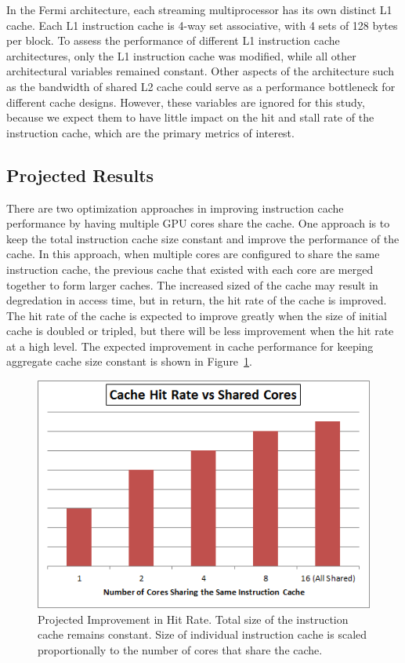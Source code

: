 In the Fermi architecture, each streaming multiprocessor has
its own distinct L1 cache. 
Each L1 instruction cache is 4-way set associative, with 4 sets of
128 bytes per block. 
To assess the  performance of different L1 instruction cache
architectures, only the L1 instruction cache was modified, while all
other architectural variables remained constant. 
Other aspects of the architecture such as the bandwidth of shared L2
cache could serve as a performance bottleneck for different cache
designs. 
However, these variables are ignored for this study, because we expect
them to have little impact on the hit and stall rate of the
instruction cache, which are the primary metrics of interest.

\subsection{Projected Results}

There are two optimization approaches in improving instruction cache performance by having
multiple GPU cores share the cache. 
One approach is to keep the total instruction cache size constant and
improve the performance of the cache.
In this approach, when multiple cores are configured to share the same
instruction cache, the previous cache that existed with each core are
merged together to form larger caches. 
The increased sized of the cache may result in degredation in access
time, but in return, the hit rate of the cache is improved. 
The hit rate of the cache is expected to improve greatly when the size
of initial cache is doubled or tripled, but there will be less
improvement when the hit rate at a high level. 
The expected improvement in cache performance for keeping aggregate cache size 
constant is shown in Figure~\ref{HitImprov}. 


\begin{figure}[t]
\centering
\includegraphics[width=\columnwidth]{graphics/HitRateImprov.png}
\caption{Projected Improvement in Hit Rate. Total size of the instruction
cache remains constant. Size of individual instruction cache is scaled 
proportionally to the number of cores that share the cache.}
\label{HitImprov}
\end{figure}


